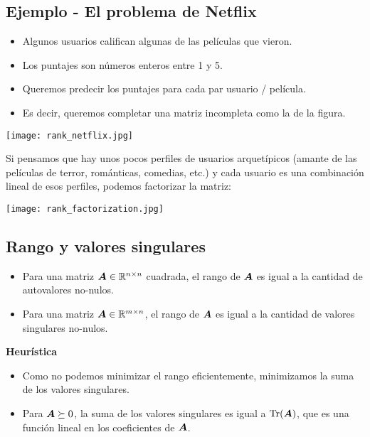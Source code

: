 \subsection{Ejemplo - El problema de Netflix}

\begin{itemize}
\item Algunos usuarios califican algunas de las películas que vieron.
\item Los puntajes son números enteros entre 1 y 5.
\item Queremos predecir los puntajes para cada par usuario / película.
\item Es decir, queremos completar una matriz incompleta como la de la figura.
\end{itemize}
\begin{center}
\texttt{[image: rank\_netflix.jpg]}
\end{center}

Si pensamos que hay unos pocos perfiles de usuarios arquetípicos (amante de las películas de terror, románticas, comedias, etc.) y cada usuario es una combinación lineal de esos perfiles, podemos factorizar la matriz:

\begin{center}
\texttt{[image: rank\_factorization.jpg]}
\end{center}

\subsection{Rango y valores singulares}

\begin{itemize}
\item Para una matriz $\bm{A} \in \mathbb{R}^{n\times n}$ cuadrada, el rango de $\bm{A}$ es igual a la cantidad de autovalores no-nulos.
\item Para una matriz $\bm{A} \in \mathbb{R}^{m \times n}$, el rango de $\bm{A}$ es igual a la cantidad de valores singulares no-nulos.
\end{itemize}

\textbf{Heurística}
\begin{itemize}
\item Como no podemos minimizar el rango eficientemente, minimizamos la suma de los valores singulares.
\item Para $\bm{A} \succeq 0$, la suma de los valores singulares es igual a $\operatorname{Tr}(\bm{A})$, que es una función lineal en los coeficientes de $\bm{A}$.
\end{itemize}


